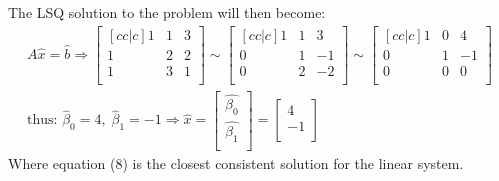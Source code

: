 \documentclass[11pt, a4paper]{article}
\begin{document}
The LSQ solution to the problem will then become:
\begin{gather}
  A\hat{x} = \hat{b} \Rightarrow
  \begin{bmatrix}[cc|c]
    1 & 1 & 3\\
    1 & 2 & 2\\
    1 & 3 & 1\\
  \end{bmatrix}
  \sim
  \begin{bmatrix}[cc|c]
    1 & 1 & 3\\
    0 & 1 & -1\\
    0 & 2 & -2\\
  \end{bmatrix}
  \sim
  \begin{bmatrix}[cc|c]
    1 & 0 & 4\\
    0 & 1 & -1\\
    0 & 0 & 0\\
  \end{bmatrix}\\
  \text{thus: } \hat{\beta}_0 = 4, \; \hat{\beta}_1 = -1 \Rightarrow 
  \hat{x} = \begin{bmatrix} \hat{\beta_0}\\ \hat{\beta_1}\\ \end{bmatrix} = \begin{bmatrix} 4\\ -1\\ \end{bmatrix}
\end{gather}
Where equation (8) is the closest consistent solution for the linear system.
\end{document}
